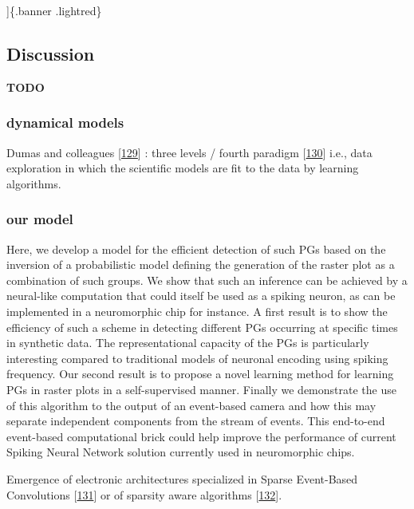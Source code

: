 {]}\{.banner .lightred\}

\hypertarget{discussion}{%
\subsection{Discussion}\label{discussion}}

\textbf{TODO}

\hypertarget{dynamical-models}{%
\subsubsection{dynamical models}\label{dynamical-models}}

Dumas and colleagues {[}\protect\hyperlink{ref-WxQdcMB2}{129}{]} : three levels / fourth paradigm {[}\protect\hyperlink{ref-JrZPoxk9}{130}{]} i.e., data exploration in which the scientific models are fit to the data by learning algorithms.

\hypertarget{our-model}{%
\subsubsection{our model}\label{our-model}}

Here, we develop a model for the efficient detection of such PGs based on the inversion of a probabilistic model defining the generation of the raster plot as a combination of such groups. We show that such an inference can be achieved by a neural-like computation that could itself be used as a spiking neuron, as can be implemented in a neuromorphic chip for instance. A first result is to show the efficiency of such a scheme in detecting different PGs occurring at specific times in synthetic data. The representational capacity of the PGs is particularly interesting compared to traditional models of neuronal encoding using spiking frequency. Our second result is to propose a novel learning method for learning PGs in raster plots in a self-supervised manner. Finally we demonstrate the use of this algorithm to the output of an event-based camera and how this may separate independent components from the stream of events. This end-to-end event-based computational brick could help improve the performance of current Spiking Neural Network solution currently used in neuromorphic chips.

Emergence of electronic architectures specialized in Sparse Event-Based Convolutions {[}\protect\hyperlink{ref-sJ03d2Zj}{131}{]} or of sparsity aware algorithms {[}\protect\hyperlink{ref-R5BYFgCP}{132}{]}.


